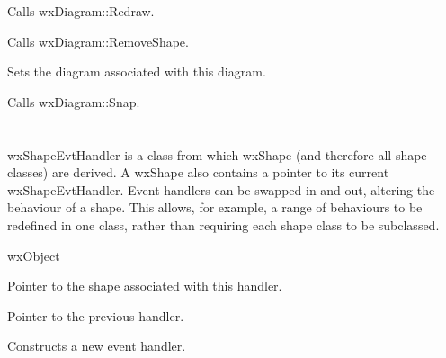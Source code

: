
Calls wxDiagram::Redraw.



Calls wxDiagram::RemoveShape.



Sets the diagram associated with this diagram.



Calls wxDiagram::Snap.



\section{}\label{wxshapeevthandler}

wxShapeEvtHandler is a class from which wxShape (and therefore all shape classes) are derived.
A wxShape also contains a pointer to its current wxShapeEvtHandler. Event handlers
can be swapped in and out, altering the behaviour of a shape. This allows, for example,
a range of behaviours to be redefined in one class, rather than requiring
each shape class to be subclassed.


wxObject




Pointer to the shape associated with this handler.



Pointer to the previous handler.



Constructs a new event handler.

